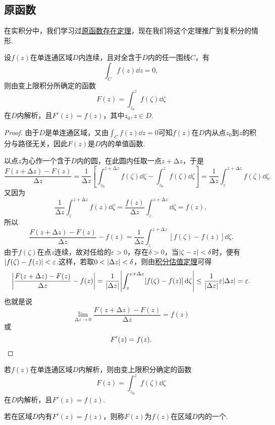 \subsection{原函数}
在实积分中，我们学习过\hyperref[theorem:定积分.原函数存在定理]{原函数存在定理}，现在我们将这个定理推广到复积分的情形.
\begin{theorem}\label{theorem:解析函数的积分表示.原函数1}
设\(f(z)\)在单连通区域\(D\)内连续，且对全含于\(D\)内的任一围线\(C\)，有\[
\int_C f(z) \dd{z} = 0,
\]则由变上限积分所确定的函数\[
F(z) = \int_{z_0}^z f(\zeta) \dd{\zeta}
\]在\(D\)内解析，且\(F'(z) = f(z)\)，其中\(z_0, z \in D\).
\begin{proof}
由于\(D\)是单连通区域，又由\(\int_C f(z) \dd{z}=0\)可知\(f(z)\)在\(D\)内从点\(z_0\)到\(z\)的积分与路径无关，因此\(F(z)\)是\(D\)内的单值函数.

以点\(z\)为心作一个含于\(D\)内的圆，在此圆内任取一点\(z+\increment z\)，于是\[
\frac{F(z+\increment z)-F(z)}{\increment z}
= \frac{1}{\increment z}\left[
 \int_{z_0}^{z+\increment z} f(\zeta) \dd{\zeta}
 -\int_{z_0}^z f(\zeta) \dd{\zeta}
\right]
= \frac{1}{\increment z} \int_z^{z+\increment z} f(\zeta) \dd{\zeta}.
\]又因为\[
\frac{1}{\increment z} \int_z^{z+\increment z} f(z) \dd{\zeta}
= \frac{f(z)}{\increment z} \int_z^{z+\increment z} \dd{\zeta} = f(z),
\]所以\[
\frac{F(z+\increment z)-F(z)}{\increment z} - f(z)
= \frac{1}{\increment z} \int_z^{z+\increment z} [f(\zeta)-f(z)]\dd{\zeta}.
\]由于\(f(\zeta)\)在点\(z\)连续，故对任给的\(\varepsilon > 0\)，存在\(\delta > 0\)，当\(\abs{\zeta - z} < \delta\)时，便有\(\abs{f(\zeta)-f(z)} < \varepsilon\).这样，若取\(0<\abs{\Delta z}<\delta\)，则由\hyperref[theorem:解析函数的积分表示.积分估值定理]{积分估值定理}可得\[
\abs{\frac{F(z+\Delta z)-F(z)}{\Delta z} - f(z)}
= \frac{1}{\abs{\Delta z}} \abs{ \int_z^{z+\Delta z} [f(\zeta)-f(z)]\dd{\zeta} }
\leq \frac{1}{\abs{\Delta z}} \varepsilon \abs{\Delta z}
= \varepsilon.
\]也就是说\[
\lim\limits_{\increment z\to0} \frac{F(z+\increment z)-F(z)}{\increment z} = f(z)
\]或\[
F'(z) = f(z).
\qedhere
\]
\end{proof}
\end{theorem}

\begin{corollary}\label{theorem:解析函数的积分表示.原函数2}
若\(f(z)\)在单连通区域\(D\)内解析，则由变上限积分确定的函数\[
F(z) = \int_{z_0}^z f(\zeta) \dd{\zeta}
\]在\(D\)内解析，且\(F'(z) = f(z)\).
\end{corollary}

\begin{definition}
若在区域\(D\)内有\(F'(z)=f(z)\)，则称\(F(z)\)为\(f(z)\)在区域\(D\)内的一个.
\end{definition}


